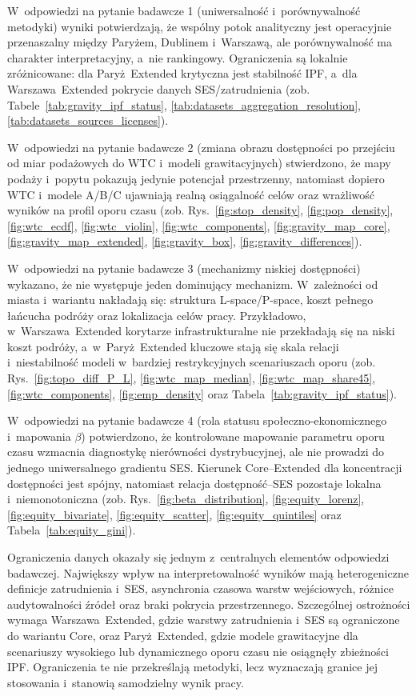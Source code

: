 \documentclass{pracamgr}
\begin{document}
W~odpowiedzi na pytanie badawcze 1 (uniwersalność i~porównywalność metodyki) wyniki potwierdzają, że wspólny potok analityczny jest operacyjnie przenaszalny między Paryżem, Dublinem i~Warszawą, ale porównywalność ma charakter interpretacyjny, a~nie rankingowy. Ograniczenia są lokalnie zróżnicowane: dla \mbox{Paryż~Extended} krytyczna jest stabilność \mbox{IPF}, a~dla \mbox{Warszawa~Extended} pokrycie danych \mbox{SES}/zatrudnienia (zob. Tabele~\ref{tab:gravity_ipf_status}, \ref{tab:datasets_aggregation_resolution}, \ref{tab:datasets_sources_licenses}).

W~odpowiedzi na pytanie badawcze 2 (zmiana obrazu dostępności po przejściu od miar podażowych do \mbox{WTC} i~modeli grawitacyjnych) stwierdzono, że mapy podaży i~popytu pokazują jedynie potencjał przestrzenny, natomiast dopiero \mbox{WTC} i~modele A/B/C ujawniają realną osiągalność celów oraz wrażliwość wyników na profil oporu czasu (zob. Rys.~\ref{fig:stop_density}, \ref{fig:pop_density}, \ref{fig:wtc_ecdf}, \ref{fig:wtc_violin}, \ref{fig:wtc_components}, \ref{fig:gravity_map_core}, \ref{fig:gravity_map_extended}, \ref{fig:gravity_box}, \ref{fig:gravity_differences}).

W~odpowiedzi na pytanie badawcze 3 (mechanizmy niskiej dostępności) wykazano, że nie występuje jeden dominujący mechanizm. W~zależności od miasta i~wariantu nakładają się: struktura \mbox{L-space}/\mbox{P-space}, koszt pełnego łańcucha podróży oraz lokalizacja celów pracy. Przykładowo, w~\mbox{Warszawa~Extended} korytarze infrastrukturalne nie przekładają się na niski koszt podróży, a~w~\mbox{Paryż~Extended} kluczowe stają się skala relacji i~niestabilność modeli w~bardziej restrykcyjnych scenariuszach oporu (zob. Rys.~\ref{fig:topo_diff_P_L}, \ref{fig:wtc_map_median}, \ref{fig:wtc_map_share45}, \ref{fig:wtc_components}, \ref{fig:emp_density} oraz Tabela~\ref{tab:gravity_ipf_status}).

W~odpowiedzi na pytanie badawcze 4 (rola statusu społeczno-ekonomicznego i~mapowania $\beta$) potwierdzono, że kontrolowane mapowanie parametru oporu czasu wzmacnia diagnostykę nierówności dystrybucyjnej, ale nie prowadzi do jednego uniwersalnego gradientu \mbox{SES}. Kierunek \mbox{Core--Extended} dla koncentracji dostępności jest spójny, natomiast relacja dostępność--\mbox{SES} pozostaje lokalna i~niemonotoniczna (zob. Rys.~\ref{fig:beta_distribution}, \ref{fig:equity_lorenz}, \ref{fig:equity_bivariate}, \ref{fig:equity_scatter}, \ref{fig:equity_quintiles} oraz Tabela~\ref{tab:equity_gini}).

Ograniczenia danych okazały się jednym z~centralnych elementów odpowiedzi badawczej. Największy wpływ na interpretowalność wyników mają heterogeniczne definicje zatrudnienia i~\mbox{SES}, asynchronia czasowa warstw wejściowych, różnice audytowalności źródeł oraz braki pokrycia przestrzennego. Szczególnej ostrożności wymaga \mbox{Warszawa~Extended}, gdzie warstwy zatrudnienia i~\mbox{SES} są ograniczone do wariantu \mbox{Core}, oraz \mbox{Paryż~Extended}, gdzie modele grawitacyjne dla scenariuszy wysokiego lub dynamicznego oporu czasu nie osiągnęły zbieżności \mbox{IPF}. Ograniczenia te nie przekreślają metodyki, lecz wyznaczają granice jej stosowania i~stanowią samodzielny wynik pracy.
\end{document}
